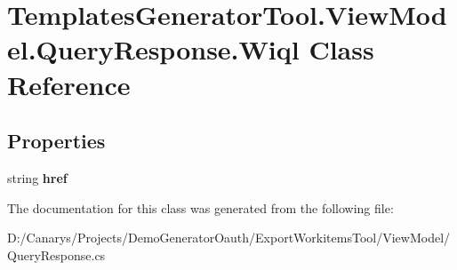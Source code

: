 \hypertarget{class_templates_generator_tool_1_1_view_model_1_1_query_response_1_1_wiql}{}\section{Templates\+Generator\+Tool.\+View\+Model.\+Query\+Response.\+Wiql Class Reference}
\label{class_templates_generator_tool_1_1_view_model_1_1_query_response_1_1_wiql}
\subsection*{Properties}
\begin{DoxyCompactItemize}
\item 
\mbox{\label{class_templates_generator_tool_1_1_view_model_1_1_query_response_1_1_wiql_a2a0e89a69812e6b920eca51fbfbf9ea7}} 
string {\bfseries href}
\end{DoxyCompactItemize}


The documentation for this class was generated from the following file\+:\begin{DoxyCompactItemize}
\item 
D\+:/\+Canarys/\+Projects/\+Demo\+Generator\+Oauth/\+Export\+Workitems\+Tool/\+View\+Model/Query\+Response.\+cs\end{DoxyCompactItemize}
